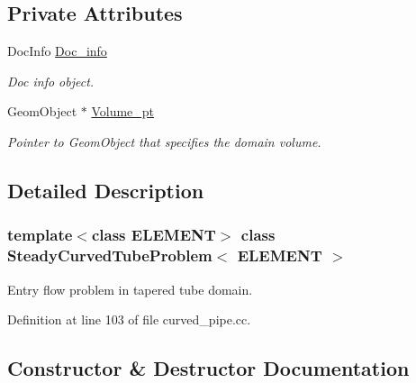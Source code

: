\subsection*{Private Attributes}
\begin{DoxyCompactItemize}
\item 
Doc\+Info \hyperlink{classSteadyCurvedTubeProblem_a1a48437e34e38bf6d96aef540fda70b6}{Doc\+\_\+info}
\begin{DoxyCompactList}\small\item\em Doc info object. \end{DoxyCompactList}\item 
Geom\+Object $\ast$ \hyperlink{classSteadyCurvedTubeProblem_a06fa168a75e0ce3b0cd0eccacf226a6c}{Volume\+\_\+pt}
\begin{DoxyCompactList}\small\item\em Pointer to Geom\+Object that specifies the domain volume. \end{DoxyCompactList}\end{DoxyCompactItemize}


\subsection{Detailed Description}
\subsubsection*{template$<$class E\+L\+E\+M\+E\+NT$>$\newline
class Steady\+Curved\+Tube\+Problem$<$ E\+L\+E\+M\+E\+N\+T $>$}

Entry flow problem in tapered tube domain. 

Definition at line 103 of file curved\+\_\+pipe.\+cc.



\subsection{Constructor \& Destructor Documentation}
\mbox{\label{classSteadyCurvedTubeProblem_ac276276fa87e57ff486e3af24b72e38b}} 
